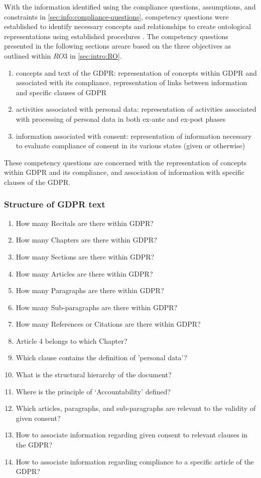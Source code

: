 With the information identified using the compliance questions, assumptions, and constraints in \autoref{sec:info:compliance-questions}, competency questions were established to identify necessary concepts and relationships to create ontological representations using established procedures \cite{noy,neon}.
The competency questions presented in the following sections areare based on the three objectives as outlined within $RO3$ in \autoref{sec:intro:RO}.  
\begin{enumerate}
    \item concepts and text of the GDPR: representation of concepts within GDPR and associated with its compliance, representation of links between information and specific clauses of GDPR
    \item activities associated with personal data: representation of activities associated with processing of personal data in both ex-ante and ex-post phases
    \item information associated with consent: representation of information necessary to evaluate compliance of consent in its various states (given or otherwise)
\end{enumerate}

These competency questions are concerned with the representation of concepts within GDPR and its compliance, and association of information with specific clauses of the GDPR.

\subsubsection{Structure of GDPR text}
\begin{enumerate}[label={\textit{CQ.\theenumi}}]
    \item How many Recitals are there within GDPR?
    \item How many Chapters are there within GDPR?
    \item How many Sections are there within GDPR?
    \item How many Articles are there within GDPR?
    \item How many Paragraphs are there within GDPR?
    \item How many Sub-paragraphs are there within GDPR?
    \item How many References or Citations are there within GDPR?
    \item Article 4 belongs to which Chapter?
    \item Which clause contains the definition of 'personal data'?
    \item What is the structural hierarchy of the document?
    \item Where is the principle of `Accountability' defined?
    \item Which articles, paragraphs, and sub-paragraphs are relevant to the validity of given consent?
    \item How to associate information regarding given consent to relevant clauses in the GDPR?
    \item How to associate information regarding compliance to a specific article of the GDPR?
\end{enumerate}

